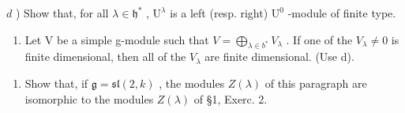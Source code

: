 \(d\) ) Show that, for all \(\lambda \in \mathfrak{h}^*\) , \(\mathrm{U}^{\lambda}\) is a left (resp. right) \(\mathrm{U}^0\) -module of finite type.

\begin{enumerate}
\def\labelenumi{\alph{enumi})}
\setcounter{enumi}{4}
\tightlist
\item
  Let V be a simple g-module such that \(V = \bigoplus_{\lambda \in b^{*}} V_{\lambda}\) . If one of the \(V_{\lambda} \neq 0\) is finite dimensional, then all of the \(V_{\lambda}\) are finite dimensional. (Use d).
\end{enumerate}

\begin{enumerate}
\def\labelenumi{\arabic{enumi})}
\setcounter{enumi}{4}
\tightlist
  \item
  Show that, if \(\mathfrak{g} = \mathfrak{sl}(2,k)\) , the modules \(Z(\lambda)\) of this paragraph are isomorphic to the modules \(Z(\lambda)\) of §1, Exerc. 2.
\end{enumerate}

